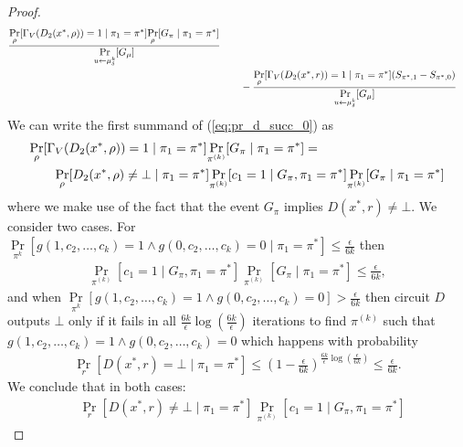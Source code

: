\begin{proof}
\begin{align}
  \frac{\underset{\rho}{\Pr}[\Gamma_V(D_2(x^*, \rho)) = 1 \mid \pi_1 = \pi^*] \underset{\rho}{\Pr}[G_{\pi} \mid \pi_1 = \pi^*]} {\underset{u \leftarrow \mu_{\delta}^{k}}{\Pr}[G_{\mu}]} \notag\\
  & \mbox\qquad - \frac{\underset{\rho}{\Pr}[\Gamma_V(D_2(x^*, r)) = 1 \mid \pi_1 = \pi^*](S_{\pi^*,1} - S_{\pi^*,0})}{\underset{u \leftarrow \mu_{\delta}^{k}}{\Pr}[G_{\mu}]}
\end{align}
%
We can write the first summand of (\ref{eq:pr_d_succ_0}) as
\begin{align}
  &\underset{\rho}{\Pr}[\Gamma_V(D_2(x^*,\rho)) = 1 \mid \pi_1 = \pi^*] \underset{\pi^{(k)}}{\Pr}[G_{\pi} \mid \pi_1 = \pi^*] = \notag\\
  &\mbox\qquad \underset{\rho}{\Pr}[D_2(x^*,\rho) \neq \bot \mid \pi_1 = \pi^*]
  \underset{\pi^{(k)}}{\Pr}[c_1 = 1 \mid G_{\pi}, \pi_1 = \pi^*]
  \underset{\pi^{(k)}}{\Pr}[G_{\pi} \mid \pi_1 = \pi^*]
\end{align}
where we make use of the fact that the event $G_{\pi}$ implies $D(x^*, r) \neq \bot$.
We consider two cases.
For $\underset{\pi^{k}}{\Pr}[g(1, c_2, \dots, c_k) = 1 \land g(0, c_2, \dots,c_k ) = 0 \mid \pi_1 = \pi^*] \leq \frac{\epsilon}{6k}$ then
\begin{align}
  \underset{\pi^{(k)}}{\Pr}[c_1 = 1 \mid G_{\pi}, \pi_1 = \pi^*] \underset{\pi^{(k)}}{\Pr}[G_{\pi} \mid \pi_1 = \pi^*] \leq \frac{\epsilon}{6k},
\end{align}
and when $\underset{\pi^{k}}{\Pr}[g(1, c_2, \dots, c_k) = 1 \land g(0, c_2, \dots,c_k ) = 0] > \frac{\epsilon}{6k}$ then circuit $D$ outputs $\bot$
only if it fails in all $\frac{6k}{\epsilon} \log(\frac{6k}{\epsilon})$ iterations to find $\pi^{(k)}$ such that $g(1, c_2, \dots, c_k) = 1 \land g(0, c_2, \dots, c_k) = 0$
which happens with probability
\begin{align}
\underset{r}{\Pr}[D(x^*,r) = \bot \mid \pi_1 = \pi^*] \leq (1 - \frac{\epsilon}{6k})^{\frac{6k}{\epsilon}\log(\frac{\epsilon}{6k})} \leq \frac{\epsilon}{6k}.
\end{align}
We conclude that in both cases:
\begin{align}
  &\underset{r}{\Pr}[D(x^*,r) \neq \bot \mid \pi_1 = \pi^*]
  \underset{\pi^{(k)}}{\Pr}[c_1 = 1 \mid G_{\pi}, \pi_1 = \pi^*]

\end{align}
\end{proof}
